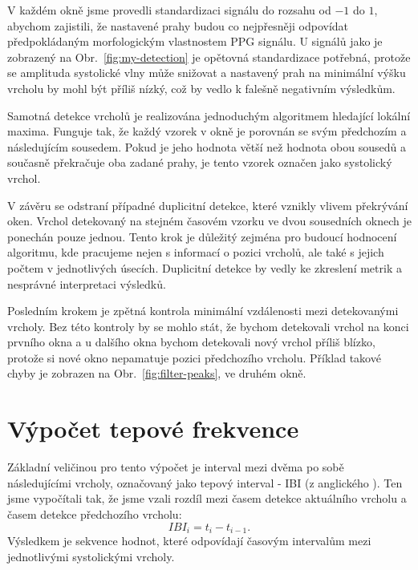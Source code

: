 V každém okně jsme provedli standardizaci signálu do rozsahu od \(-1\) do \(1\), abychom zajistili, že nastavené prahy budou co nejpřesněji odpovídat předpokládaným morfologickým vlastnostem PPG signálu.
U signálů jako je zobrazený na Obr.~\ref{fig:my-detection} je opětovná standardizace potřebná, protože se amplituda systolické vlny může snižovat a nastavený prah na minimální výšku vrcholu by mohl být příliš nízký, což by vedlo k falešně negativním výsledkům.

Samotná detekce vrcholů je realizována jednoduchým algoritmem hledající lokální maxima.
Funguje tak, že každý vzorek v okně je porovnán se svým předchozím a následujícím sousedem.
Pokud je jeho hodnota větší než hodnota obou sousedů a současně překračuje oba zadané prahy, je tento vzorek označen jako systolický vrchol.

V závěru se odstraní případné duplicitní detekce, které vznikly vlivem překrývání oken.
Vrchol detekovaný na stejném časovém vzorku ve dvou sousedních oknech je ponechán pouze jednou.
Tento krok je důležitý zejména pro budoucí hodnocení algoritmu, kde pracujeme nejen s informací o pozici vrcholů, ale také s jejich počtem v jednotlivých úsecích.
Duplicitní detekce by vedly ke zkreslení metrik a nesprávné interpretaci výsledků.

Posledním krokem je zpětná kontrola minimální vzdálenosti mezi detekovanými vrcholy.
Bez této kontroly by se mohlo stát, že bychom detekovali vrchol na konci prvního okna a u dalšího okna bychom detekovali nový vrchol příliš blízko, protože si nové okno nepamatuje pozici předchozího vrcholu.
Příklad takové chyby je zobrazen na Obr.~\ref{fig:filter-peaks}, ve druhém okně.

\section{Výpočet tepové frekvence}
\label{sec:alg_hr}
Základní veličinou pro tento výpočet je interval mezi dvěma po sobě následujícími vrcholy, označovaný jako tepový interval - \acs{IBI} (z anglického ).
Ten jsme vypočítali tak, že jsme vzali rozdíl mezi časem detekce aktuálního vrcholu a časem detekce předchozího vrcholu:
\begin{equation}
	\label{eq:IBI}
	IBI_{i} = t_{i} - t_{i-1}.
\end{equation}
Výsledkem je sekvence hodnot, které odpovídají časovým intervalům mezi jednotlivými systolickými vrcholy.

